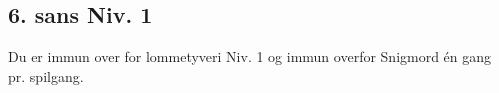 \subsection*{6. sans Niv. 1}
Du er immun over for lommetyveri Niv. 1 og immun overfor Snigmord én gang pr. spilgang.\\
